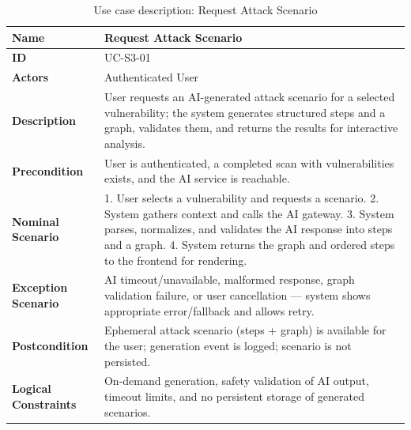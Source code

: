 \begin{table}[H]
  \centering
  \caption{Use case description: Request Attack Scenario}
  \label{tab:request-scenario}
  \renewcommand{\arraystretch}{1.4}
  \small
  \begin{tabularx}{\textwidth}{|p{2.5cm}|X|}
    \hline
    \textbf{Name} & Request Attack Scenario \\\hline
    \textbf{ID} & UC-S3-01 \\\hline
    \textbf{Actors} & Authenticated User \\\hline
    \textbf{Description} & User requests an AI-generated attack scenario for a selected vulnerability; the system generates structured steps and a graph, validates them, and returns the results for interactive analysis. \\\hline
    \textbf{Precondition} & User is authenticated, a completed scan with vulnerabilities exists, and the AI service is reachable. \\\hline
    \textbf{Nominal Scenario} & 1. User selects a vulnerability and requests a scenario. 2. System gathers context and calls the AI gateway. 3. System parses, normalizes, and validates the AI response into steps and a graph. 4. System returns the graph and ordered steps to the frontend for rendering. \\\hline
    \textbf{Exception Scenario} & AI timeout/unavailable, malformed response, graph validation failure, or user cancellation — system shows appropriate error/fallback and allows retry. \\\hline
    \textbf{Postcondition} & Ephemeral attack scenario (steps + graph) is available for the user; generation event is logged; scenario is not persisted. \\\hline
    \textbf{Logical Constraints} & On-demand generation, safety validation of AI output, timeout limits, and no persistent storage of generated scenarios. \\\hline
  \end{tabularx}
\end{table}

